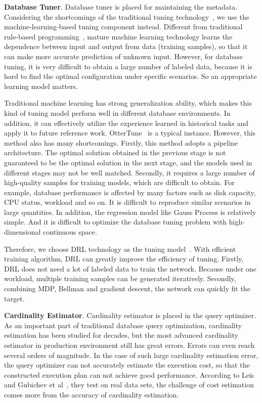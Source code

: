 \noindent \textbf{Database Tuner}. Database tuner is placed for maintaining the metadata. Considering the shortcomings of the traditional tuning technology~\cite{DBLP:journals/pvldb/DuanTB09, DBLP:conf/cloud/ZhuLGBMLSY17}, we use the machine-learning-based tuning component instead. Different from traditional rule-based programming~\cite{DBLP:conf/cloud/ZhuLGBMLSY17, DBLP:conf/fskd/WeiDH14}, mature machine learning technology learns the dependence between input and output from data (training samples), so that it can make more accurate prediction of unknown input. However, for database tuning, it is very difficult to obtain a large number of labeled data, because it is hard to find the optimal configuration under specific scenarios. So an appropriate learning model matters.

Traditional machine learning has strong generalization ability, which makes this kind of tuning model perform well in different database environments. In addition, it can effectively utilize the experience learned in historical tasks and apply it to future reference work. OtterTune~\cite{DBLP:conf/sigmod/AkenPGZ17} is a typical instance. However, this method also has many shortcomings. Firstly, this method adopts a pipeline architecture. The optimal solution obtained in the previous stage is not guaranteed to be the optimal solution in the next stage, and the models used in different stages may not be well matched. Secondly, it requires a large number of high-quality samples for training models, which are difficult to obtain. For example, database performance is affected by many factors such as disk capacity, CPU status, workload and so on. It is difficult to reproduce similar scenarios in large quantities. In addition, the regression model like Gauss Process is relatively simple. And it is difficult to optimize the database tuning problem with high-dimensional continuous space.

Therefore, we choose DRL technology as the tuning model~\cite{DBLP:conf/sigmod/cdbtune19}. With efficient training algorithm, DRL can greatly improve the efficiency of tuning. Firstly, DRL does not need a lot of labeled data to train the network. Because under one workload, multiple training samples can be generated iteratively. Secondly, combining MDP, Bellman and gradient descent, the network can quickly fit the target. 

\noindent \textbf{Cardinality Estimator}. Cardinality estimator is placed in the query optimizer. As an important part of traditional database query optimization, cardinality estimation has been studied for decades, but the most advanced cardinality estimator in production environment still has great errors. Errors can even reach several orders of magnitude. In the case of such large cardinality estimation error, the query optimizer can not accurately estimate the execution cost, so that the constructed execution plan can not achieve good performance. According to Leis and Gubichev et al~\cite{DBLP:journals/pvldb/LeisGMBK015}, they test on real data sets, the challenge of cost estimation comes more from the accuracy of cardinality estimation.

